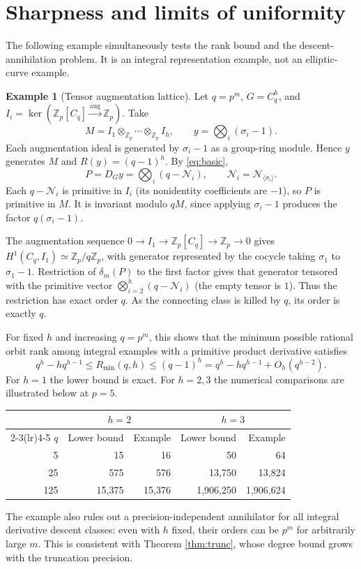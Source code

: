\documentclass[11pt,a4paper]{article}
\theoremstyle{definition}
\newtheorem{example}[theorem]{Example}
\theoremstyle{remark}
\newcommand{\Zp}{\mathbb Z_p}
\newcommand{\N}{\mathcal N}
\begin{document}
\section{Sharpness and limits of uniformity}
The following example simultaneously tests the rank bound and the descent-annihilation problem. It is an integral representation example, not an elliptic-curve example.

\begin{example}[Tensor augmentation lattice]\label{ex:sharp}
Let $q=p^m$, $G=C_q^h$, and $I_i=\ker(\Zp[C_q]\xrightarrow{\mathrm{aug}}\Zp)$. Take
\[
 M=I_1\otimes_{\Zp}\cdots\otimes_{\Zp}I_h,\qquad
 y=\bigotimes_i(\sigma_i-1).
\]
Each augmentation ideal is generated by $\sigma_i-1$ as a group-ring module. Hence $y$ generates $M$ and $R(y)=(q-1)^h$. By \eqref{eq:basic},
\[
 P=D_Gy=\bigotimes_i(q-\N_i),\qquad \N_i=\N_{\langle\sigma_i\rangle}.
\]
Each $q-\N_i$ is primitive in $I_i$ (its nonidentity coefficients are $-1$), so $P$ is primitive in $M$. It is invariant modulo $qM$, since applying $\sigma_i-1$ produces the factor $q(\sigma_i-1)$.

The augmentation sequence $0\to I_1\to\Zp[C_q]\to\Zp\to0$ gives $H^1(C_q,I_1)\simeq\Zp/q\Zp$, with generator represented by the cocycle taking $\sigma_1$ to $\sigma_1-1$. Restriction of $\delta_m(P)$ to the first factor gives that generator tensored with the primitive vector $\bigotimes_{i=2}^h(q-\N_i)$ (the empty tensor is $1$). Thus the restriction has exact order $q$. As the connecting class is killed by $q$, its order is exactly $q$.
\end{example}

For fixed $h$ and increasing $q=p^m$, this shows that the minimum possible rational orbit rank among integral examples with a primitive product derivative satisfies
\begin{equation}\label{eq:sharp}
 q^h-hq^{h-1}\le R_{\min}(q,h)\le(q-1)^h
 =q^h-hq^{h-1}+O_h(q^{h-2}).
\end{equation}
For $h=1$ the lower bound is exact. For $h=2,3$ the numerical comparisons are illustrated below at $p=5$.
\begin{center}
\begin{tabular}{rrrrr}
\toprule
 & \multicolumn{2}{c}{$h=2$} & \multicolumn{2}{c}{$h=3$}\\
\cmidrule(lr){2-3}\cmidrule(lr){4-5}
$q$ & Lower bound & Example & Lower bound & Example\\
\midrule
5 & 15 & 16 & 50 & 64\\
25 & 575 & 576 & 13,750 & 13,824\\
125 & 15,375 & 15,376 & 1,906,250 & 1,906,624\\
\bottomrule
\end{tabular}
\end{center}
The example also rules out a precision-independent annihilator for all integral derivative descent classes: even with $h$ fixed, their orders can be $p^m$ for arbitrarily large $m$. This is consistent with Theorem \ref{thm:trunc}, whose degree bound grows with the truncation precision.
\end{document}
